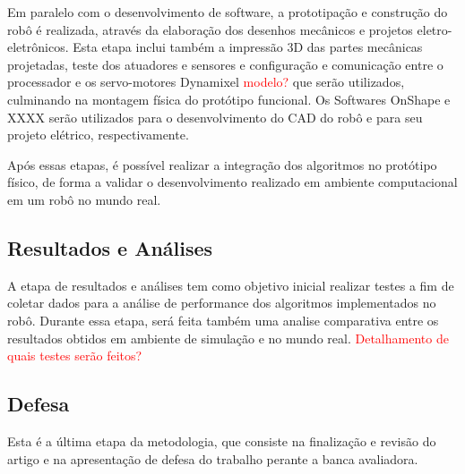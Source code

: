 \documentclass[../main.tex]{subfiles}
\begin{document}
  Em paralelo com o desenvolvimento de software, a prototipação e construção do robô é realizada, através da elaboração dos desenhos mecânicos e projetos eletro-eletrônicos. Esta etapa inclui também a impressão 3D das partes mecânicas projetadas, teste dos atuadores e sensores e configuração e comunicação entre o processador e os servo-motores Dynamixel \textcolor{red}{modelo?} que serão utilizados, culminando na montagem física do protótipo funcional. Os Softwares OnShape e XXXX serão utilizados para o desenvolvimento do CAD do robô e para seu projeto elétrico, respectivamente.

  Após essas etapas, é possível realizar a integração dos algoritmos no protótipo físico, de forma a validar o desenvolvimento realizado em ambiente computacional em um robô no mundo real.

  \subsection{Resultados e Análises}
  A etapa de resultados e análises tem como objetivo inicial realizar testes a fim de coletar dados para a análise de performance dos algoritmos implementados no robô. Durante essa etapa, será feita também uma analise comparativa entre os resultados obtidos em ambiente de simulação e no mundo real. \textcolor{red}{Detalhamento de quais testes serão feitos?}

  \subsection{Defesa}
  Esta é a última etapa da metodologia, que consiste na finalização e revisão do artigo e na apresentação de defesa do trabalho perante a banca avaliadora. 
\end{document}
